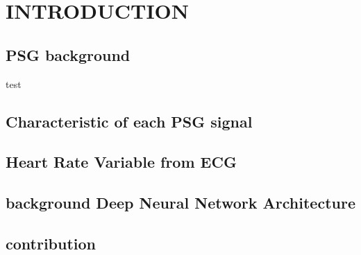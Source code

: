 \chapter{INTRODUCTION}
\section{PSG background}
test
\section{Characteristic of each PSG signal}
\section{Heart Rate Variable from ECG}
\section{background Deep Neural Network Architecture}
\section{contribution}